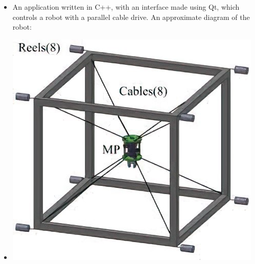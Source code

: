\documentclass[10pt,a4paper,ragged2e]{altacv}
\begin{document}
\smallskip
{}
\begin{itemize}
  \item An application written in C++, with an interface made using Qt, which controls a robot with a parallel cable drive. An approximate diagram of the robot:
  \item \includegraphics[scale=0.3]{Cube.jpg}
\end{itemize}
\smallskip

\smallskip
{}
\smallskip
{}
\smallskip

\clearpage

\nocite{*}
\end{document}
